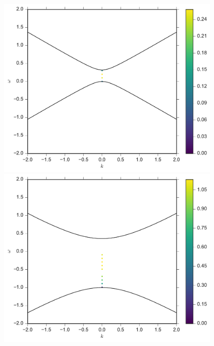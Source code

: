 \documentclass[%
preprint,
 amsmath,amssymb,
 aps,
 prd
]{revtex4-1}
\begin{document}
\begin{figure}[!htb]
  \includegraphics[width=\linewidth]{assets/spectDBWC1DRDBMAAPlt.pdf}
\endminipage\hfill
{}
  \includegraphics[width=\linewidth]{assets/spectDBWC1DRDBMZApPlt.pdf}
\endminipage\hfill
{}%

\end{figure}
\end{document}
